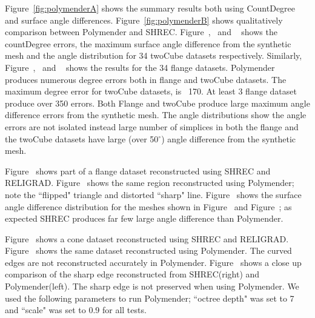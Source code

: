 Figure~\ref{fig:polymenderA} shows the summary results both using CountDegree and surface angle differences.
Figure~\ref{fig:polymenderB} shows qualitatively comparison between Polymender and SHREC. 
Figure~\protect{},~\protect{} and ~\protect{} shows the countDegree errors, the maximum surface angle difference from the synthetic mesh and the angle distribution for 34 twoCube datasets respectively. Similarly, 
Figure~\protect{},~\protect{} and ~\protect{} shows the results for the 34 flange datasets. Polymender produces numerous degree errors both in flange and twoCube datasets. The maximum degree error for twoCube datasets, is ~170. At least 3 flange dataset produce over 350 errors. Both Flange and twoCube produce large maximum angle difference errors from the synthetic mesh. The angle distributions show the angle errors are not isolated instead large number of simplices in both the flange and the twoCube datasets have large (over 50$^\circ$) angle difference from the synthetic mesh.    

Figure~\protect{} shows part of a flange dataset reconstructed using SHREC and RELIGRAD. Figure~\protect{} shows the same region reconstructed using Polymender; note the ``flipped" triangle and distorted ``sharp" line. Figure~\protect{} shows the surface angle  difference distribution for the meshes shown in Figure~\protect{} and Figure~\protect{}; as expected SHREC produces far few large angle difference than Polymender.

Figure~\protect{} shows a cone dataset reconstructed using SHREC and RELIGRAD. Figure~\protect{} shows the same dataset reconstructed using Polymender. The curved edges are not reconstructed accurately in Polymender. Figure~\protect{} shows a close up comparison of the sharp edge reconstructed from SHREC(right) and Polymender(left). The sharp edge is not preserved when using Polymender.  We used the following parameters to run Polymender; ``octree depth" was set to 7 and ``scale" was set to 0.9 for all tests. 

